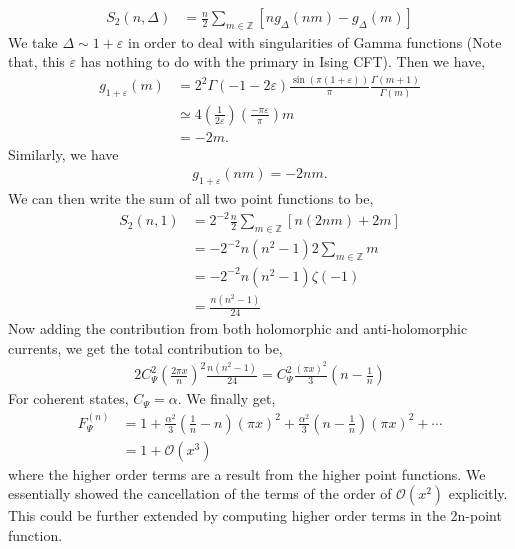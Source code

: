 \documentclass[11pt]{article}
\newcommand{\mO}{\mathcal{O}}
\newcommand{\lb}{\left(}
\newcommand{\rb}{\right)}
\begin{document}
\begin{align}
    S_2(n,\Delta) &= \frac{n}{2}\sum_{m\in \mathbb{Z}} \left[ng_\Delta(nm) - g_\Delta(m)\right] 
\end{align}
We take $\Delta \sim 1+\varepsilon$ in order to deal with singularities of Gamma functions (Note that, this $\varepsilon$ has nothing to do with the primary in Ising CFT). Then we have,
\begin{align}
    g_{1+\varepsilon}(m) &= 2^2 \Gamma(-1-2\varepsilon)\frac {\sin(\pi (1+\varepsilon))}{\pi}\frac{\Gamma (m+1)}{\Gamma(m)} 
    \\
    &\simeq 4 \lb \frac{1}{2\varepsilon} \rb \lb \frac{-\pi \varepsilon}{\pi}\rb m \\
    &= -2m .
\end{align}
Similarly, we have
\begin{align}
    g_{1+\varepsilon}(nm) = -2nm.
\end{align}
We can then write the sum of all two point functions to be,
\begin{align}
    S_2(n,1) &= 2^{-2}\frac{n}{2}\sum_{m\in \mathbb{Z}} \left[ n(2nm) + 2m \right]\\
    &= -2^{-2}n(n^2-1) 2\sum_{m\in \mathbb{Z}} m \\
    &= -2^{-2}n(n^2 - 1) \zeta(-1) \\
    &= \frac{n(n^2-1)}{24}
\end{align}
Now adding the contribution from both holomorphic and anti-holomorphic currents, we get the total contribution to be,
\begin{align}
    2C_\Psi^2 \lb\frac{2\pi x}{n}\rb^2 \frac{n(n^2-1)}{24} = C_\Psi^2\frac{(\pi x)^2}{3} \lb n-\frac{1}{n}\rb
\end{align}
For coherent states, $C_\Psi = \alpha$. We finally get, 
\begin{align}
    F_\Psi^{(n)} &= 1+ \frac{\alpha^2}{3} \lb\frac{1}{n}-n\rb (\pi x)^2 + \frac{\alpha^2}{3}\lb n-\frac{1}{n}\rb(\pi x)^2 +  \cdots\\
    &= 1 + \mO(x^3)
\end{align}
where the higher order terms are a result from the higher point functions. We essentially showed the cancellation of the terms of the order of $\mO(x^2)$ explicitly. This could be further extended by computing higher order terms in the 2n-point function. 


\end{document}

